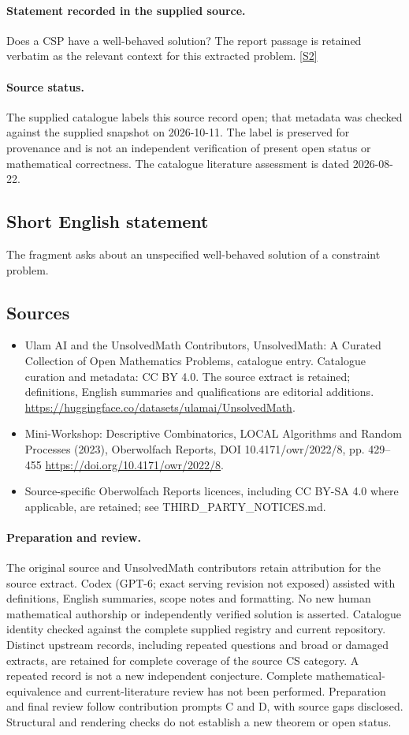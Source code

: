 \documentclass[11pt]{article}
\begin{document}
\paragraph{Statement recorded in the supplied source.}
Does a CSP have a well-behaved solution? The report passage is retained verbatim as the relevant context for this extracted problem. \href{https://doi.org/10.4171/owr/2022/8}{[S2]}
\paragraph{Source status.}
The supplied catalogue labels this source record open; that metadata was checked against the supplied snapshot on 2026-10-11. The label is preserved for provenance and is not an independent verification of present open status or mathematical correctness. The catalogue literature assessment is dated 2026-08-22.
\subsection{Short English statement}
The fragment asks about an unspecified well-behaved solution of a constraint problem.
\subsection{Sources}
\begin{itemize}
\item[S1] Ulam AI and the UnsolvedMath Contributors, UnsolvedMath: A Curated Collection of Open Mathematics Problems, catalogue entry. Catalogue curation and metadata: CC BY 4.0. The source extract is retained; definitions, English summaries and qualifications are editorial additions.
\url{https://huggingface.co/datasets/ulamai/UnsolvedMath}.
\item[S2] Mini-Workshop: Descriptive Combinatorics, LOCAL Algorithms and Random Processes (2023), Oberwolfach Reports, DOI 10.4171/owr/2022/8, pp. 429--455
\url{https://doi.org/10.4171/owr/2022/8}.
\item Source-specific Oberwolfach Reports licences, including CC BY-SA 4.0 where applicable, are retained; see THIRD\_PARTY\_NOTICES.md.
\end{itemize}
\paragraph{Preparation and review.}
The original source and UnsolvedMath contributors retain attribution for the source extract. Codex (GPT-6; exact serving revision not exposed) assisted with definitions, English summaries, scope notes and formatting. No new human mathematical authorship or independently verified solution is asserted. Catalogue identity checked against the complete supplied registry and current repository. Distinct upstream records, including repeated questions and broad or damaged extracts, are retained for complete coverage of the source CS category. A repeated record is not a new independent conjecture. Complete mathematical-equivalence and current-literature review has not been performed. Preparation and final review follow contribution prompts C and D, with source gaps disclosed. Structural and rendering checks do not establish a new theorem or open status.
\label{end:statement}
\end{document}
